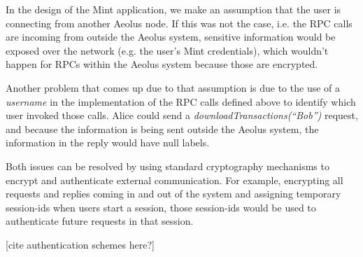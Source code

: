 In the design of the Mint application, we make an assumption that the user is connecting from another Aeolus node. If this was not the case, i.e. the RPC calls are incoming from outside the Aeolus system, sensitive information would be exposed over the network (e.g. the user's Mint credentials), which wouldn't happen for RPCs within the Aeolus system because those are encrypted.

Another problem that comes up due to that assumption is due to the use of a \emph{username} in the implementation of the RPC calls defined above to identify which user invoked those calls. Alice could send a \emph{downloadTransactions(``Bob'')} request, and because the information is being sent outside the Aeolus system, the information in the reply would have null labels.

Both issues can be resolved by using standard cryptography mechanisms to encrypt and authenticate external communication. For example, encrypting all requests and replies coming in and out of the system and assigning temporary session-ids when users start a session, those session-ids would be used to authenticate future requests in that session.

[cite authentication schemes here?]

